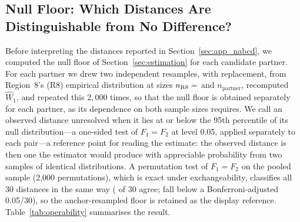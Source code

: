 \documentclass[AMA,Times1COL]{WileyNJDv5}
\begin{document}
\subsection{Null Floor: Which Distances Are Distinguishable from No Difference?}\label{sec:app_operability}

Before interpreting the distances reported in Section~\ref{sec:app_nabcd}, we computed the null floor of Section~\ref{sec:estimation} for each candidate partner. For each partner we drew two independent resamples, with replacement, from Region~8's (R8) empirical distribution at sizes $n_{\text{R8}} = \numval{nR8floor}$ and $n_{\text{partner}}$, recomputed $\widehat{W}_1$, and repeated this $2{,}000$ times, so that the null floor is obtained separately for each partner, as its dependence on both sample sizes requires. We call an observed distance unresolved when it lies at or below the 95th percentile of its null distribution---a one-sided test of $F_1 = F_2$ at level 0.05, applied separately to each pair---a reference point for reading the estimate: the observed distance is then one the estimator would produce with appreciable probability from two samples of identical distributions. A permutation test of $F_1 = F_2$ on the pooled sample (2{,}000 permutations), which is exact under exchangeability, classifies all 30 distances in the same way ( of 30 agree;  fall below a Bonferroni-adjusted 0.05/30), so the anchor-resampled floor is retained as the display reference. Table~\ref{tab:operability} summarises the result.

\begin{table}[ht]
\centering
\caption{Null floor of $\widehat{W}_1$ across the 15 candidate partners, by effect modifier. Ranges are across partners; the floor depends on each partner's sample size. Unresolved distances are those whose observed $\widehat{W}_1$ falls at or below the 95th percentile of the null distribution.\label{tab:operability}}
\end{table}
\end{document}
